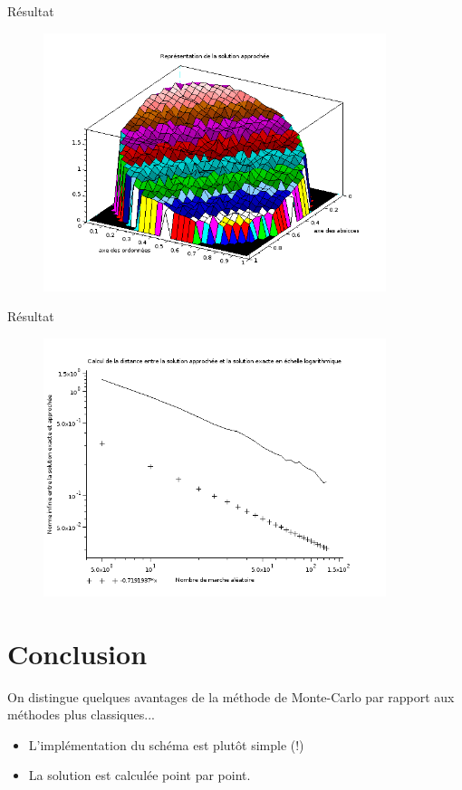 \documentclass{beamer}
\begin{document}
\begin{frame}{Résultat}
    \begin{figure}
        \centering \includegraphics[width=10cm]{ResultatsConvergences/ImageK5S25N30.png}
    \end{figure}
\end{frame}

\begin{frame}{Résultat}
    \begin{figure}
        \centering \includegraphics[width=10cm]{ResultatsConvergences/Convergence_K5_S25_N30.png}
    \end{figure}
\end{frame}

\section{Conclusion}

\begin{frame}
    On distingue quelques avantages de la méthode de Monte-Carlo par rapport aux méthodes plus classiques...
    \pause
    \begin{itemize}
        \item L'implémentation du schéma est plutôt simple (!)
        \pause
        \item La solution est calculée point par point.
    \end{itemize}
\end{frame}
\end{document}
